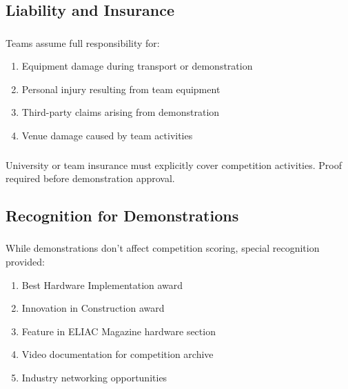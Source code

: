 \subsection{Liability and Insurance}

\subsubsection{}
Teams assume full responsibility for:
\begin{enumerate}[noitemsep]
    \item Equipment damage during transport or demonstration
    \item Personal injury resulting from team equipment
    \item Third-party claims arising from demonstration
    \item Venue damage caused by team activities
\end{enumerate}

\subsubsection{}
University or team insurance must explicitly cover competition activities. Proof required before demonstration approval.

\subsection{Recognition for Demonstrations}

\subsubsection{}
While demonstrations don't affect competition scoring, special recognition provided:
\begin{enumerate}[noitemsep]
    \item Best Hardware Implementation award
    \item Innovation in Construction award
    \item Feature in ELIAC Magazine hardware section
    \item Video documentation for competition archive
    \item Industry networking opportunities
\end{enumerate}